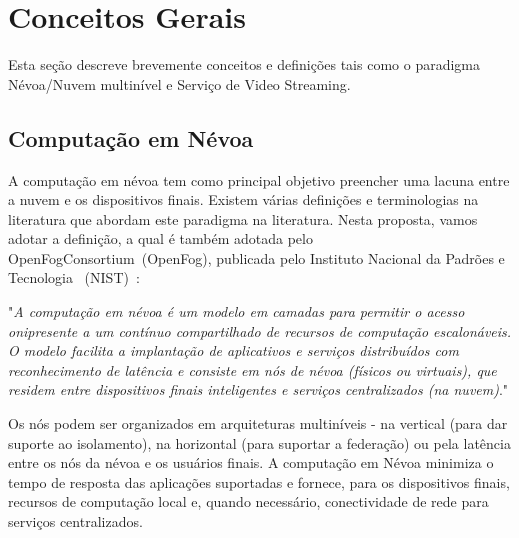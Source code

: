 \clearpage
\section{Conceitos Gerais}
\label{ch:background}

Esta seção descreve brevemente conceitos e definições tais como o paradigma Névoa/Nuvem multinível e Serviço de Video Streaming.

\subsection{Computação em Névoa}

A computação em névoa tem como principal objetivo preencher uma lacuna entre a nuvem e os dispositivos finais. Existem várias definições e terminologias na literatura que abordam este paradigma na literatura. Nesta proposta, vamos adotar a definição, a qual é também adotada pelo OpenFogConsortium~(OpenFog), publicada pelo Instituto Nacional da Padrões e Tecnologia%
~(NIST)~\cite{NIST2018-FogComputingConceptualModel}: 

\begin{displayquote}

"\textit{A computação em névoa é um modelo em camadas para permitir o acesso onipresente a um contínuo compartilhado de recursos de computação escalonáveis. O modelo facilita a implantação de aplicativos e serviços distribuídos com reconhecimento de latência e consiste em nós de névoa (físicos ou virtuais), que residem entre dispositivos finais inteligentes e serviços centralizados (na nuvem)}."

\end{displayquote}

Os nós podem ser organizados em arquiteturas multiníveis - na vertical (para dar suporte ao isolamento), na horizontal (para suportar a federação) ou pela latência entre os nós da névoa e os usuários finais. A computação em Névoa minimiza o tempo de resposta das aplicações suportadas e fornece, para os dispositivos finais, recursos de computação local e, quando necessário, conectividade de rede para serviços centralizados. %

